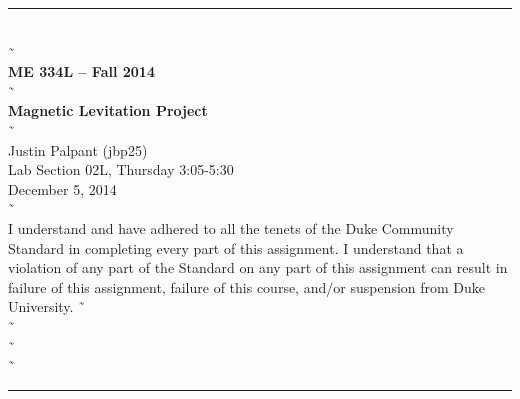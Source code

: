 \documentclass{article}
\begin{document}
\begin{center}
\rule{6.5in}{0.5mm}\\˜\\
{\bf \large ME 334L -- Fall 2014}\\˜\\
{\huge \bf Magnetic Levitation Project}\\˜\\
Justin Palpant (jbp25)\\
Lab Section 02L, Thursday 3:05-5:30\\
December 5, 2014\\˜\\
{\small I understand and have adhered to all the tenets of the Duke
 Community Standard in completing every part of this assignment. I
 understand that a violation of any part of the Standard on any part
 of this assignment can result in failure of this assignment, failure
 of this course, and/or suspension from Duke University.} 
˜\\˜\\˜\\˜\\
\rule{6.5in}{0.5mm}\\
\end{center}
\tableofcontents
\listoffigures
\pagebreak
\end{document}
